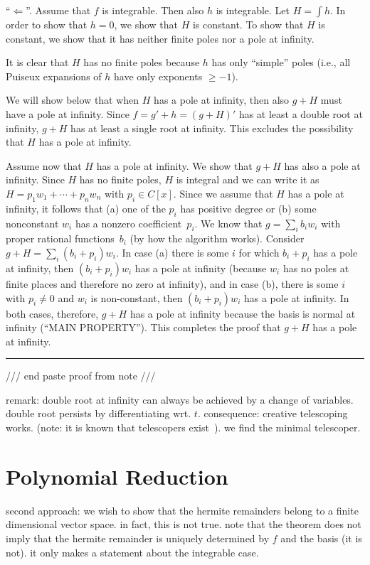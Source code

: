 \documentclass{sig-alternate}
\begin{document}
``$\Leftarrow$''. Assume that $f$ is integrable. Then also $h$ is integrable.
Let $H=\int h$.
In order to show that $h=0$, we show that $H$ is constant.
To show that $H$ is constant, we show that it has neither finite poles nor a pole at infinity.

It is clear that $H$ has no finite poles because $h$ has only ``simple'' poles (i.e., all Puiseux
expansions of $h$ have only exponents $\geq-1$).

We will show below that when $H$ has a pole at infinity, then also $g+H$ must have a pole at infinity.
Since $f=g'+h=(g+H)'$ has at least a double root at infinity, $g+H$ has at least
a single root at infinity. This excludes the possibility that $H$ has a pole at infinity.

Assume now that $H$ has a pole at infinity. We show that $g+H$ has also a pole at infinity.
Since $H$ has no finite poles, $H$ is integral and we can write it as
$H=p_1w_1+\cdots+p_nw_n$ with $p_i\in C[x]$.
Since we assume that $H$ has a pole at infinity, it follows that (a) one of the $p_i$ has positive degree
or (b) some nonconstant $w_i$ has a nonzero coefficient~$p_i$.
We know that $g=\sum_i b_iw_i$ with proper rational functions~$b_i$ (by how the algorithm works).
Consider $g+H=\sum_i (b_i+p_i)w_i$.
In case (a) there is some $i$ for which $b_i+p_i$ has a pole at infinity, then $(b_i+p_i)w_i$ has a pole
at infinity (because $w_i$ has no poles at finite places and therefore no zero at infinity),
and in case (b), there is some $i$ with $p_i\neq 0$ and $w_i$ is non-constant, then $(b_i+p_i)w_i$ has a
pole at infinity.
In both cases, therefore, $g+H$ has a pole at infinity because the basis is normal
at infinity (``MAIN PROPERTY'').
This completes the proof that $g+H$ has a pole at infinity. \rule{1ex}{1ex}

/// end paste proof from note ///

remark: double root at infinity can always be achieved by a change of variables.
double root persists by differentiating wrt. $t$. consequence: creative telescoping works.
(note: it is known that telescopers exist~\cite{..,..,..}).
we find the minimal telescoper.

\section{Polynomial Reduction}

second approach: we wish to show that the hermite remainders belong to a finite dimensional
vector space. in fact, this is not true.
note that the theorem does not imply that the hermite remainder is uniquely determined by
$f$ and the basis (it is not). it only makes a statement about the integrable case.
\end{document}
